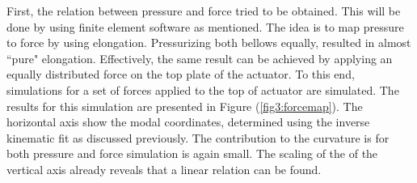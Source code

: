 First, the relation between pressure and force tried to be obtained. This will be done by using finite element software as mentioned. The idea is to map pressure to force by using elongation. Pressurizing both bellows equally, resulted in almost ``pure" elongation. Effectively, the same result can be achieved by applying an equally distributed force on the top plate of the actuator. To this end, simulations for a set of forces applied to the top of actuator are simulated. The results for this simulation are presented in Figure (\ref{fig3:forcemap}). The horizontal axis show the modal coordinates, determined using the inverse kinematic fit as discussed previously. The contribution to the curvature is for both pressure and force simulation is again small. The scaling of the of the vertical axis already reveals that a linear relation can be found.


